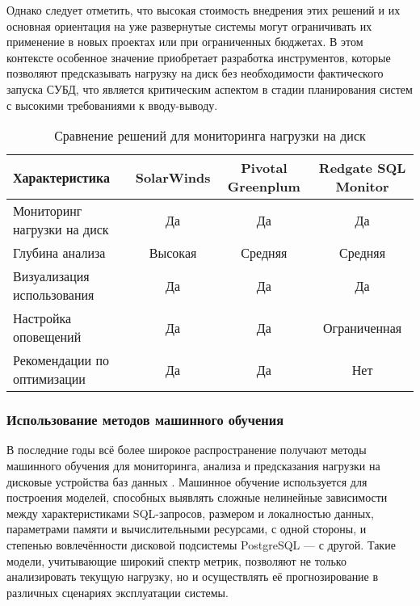 Однако следует отметить, что высокая стоимость внедрения этих решений и их основная ориентация на уже развернутые системы могут 
ограничивать их применение в новых проектах или при ограниченных бюджетах. В этом контексте особенное значение приобретает 
разработка инструментов, которые позволяют предсказывать нагрузку на диск без необходимости фактического запуска СУБД, 
что является критическим аспектом в стадии планирования систем с высокими требованиями к вводу-выводу.

\begin{table}[H]
    \centering
    \small %
    \setlength{\tabcolsep}{4pt} %
    \renewcommand{\arraystretch}{1.2} %
    \begin{tabular}{|p{5cm}|c|c|c|}
        \hline
        \textbf{Характеристика} & \textbf{SolarWinds} & \textbf{Pivotal Greenplum} & \textbf{Redgate SQL Monitor} \\ 
        \hline
        Мониторинг нагрузки на диск & Да & Да & Да \\ 
        \hline
        Глубина анализа & Высокая & Средняя & Средняя \\ 
        \hline
        Визуализация использования & Да & Да & Да \\ 
        \hline
        Настройка оповещений & Да & Да & Ограниченная \\ 
        \hline
        Рекомендации по оптимизации & Да & Да & Нет \\ 
        \hline
    \end{tabular}
    \caption{Сравнение решений для мониторинга нагрузки на диск}
    \label{tab:disk_monitoring}
\end{table}
\subsubsection{Использование методов машинного обучения}

В последние годы всё более широкое распространение получают методы машинного обучения для мониторинга, 
анализа и предсказания нагрузки на дисковые устройства баз данных \cite{zaghloul2024correction, chen2019machine, sun2023predictive}. 
Машинное обучение используется для построения моделей, способных выявлять сложные нелинейные зависимости между характеристиками 
SQL-запросов, размером и локалностью данных, параметрами памяти и вычислительными ресурсами, с одной стороны, 
и степенью вовлечённости дисковой подсистемы PostgreSQL — с другой. \cite{cheng2025rlstorage} Такие модели, учитывающие широкий спектр метрик, 
позволяют не только анализировать текущую нагрузку, но и осуществлять её прогнозирование в различных сценариях эксплуатации системы.

